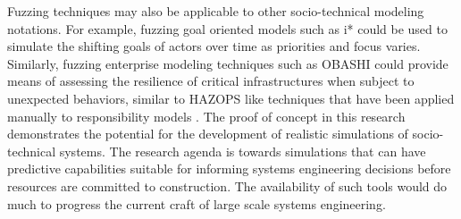 \documentclass{llncs}
\begin{document}
Fuzzing techniques may also be applicable to other socio-technical modeling notations.  For example, fuzzing goal
oriented models such as i* could be used to simulate the shifting goals of actors over time as priorities and focus
varies.  Similarly, fuzzing enterprise modeling techniques such as OBASHI could provide means of assessing the
resilience of critical infrastructures when subject to unexpected behaviors, similar to HAZOPS like techniques that have
been applied manually to responsibility models \citep{lock09modelling}. The proof of concept in this research demonstrates
the potential for the development of realistic simulations of socio-technical systems. The research agenda is towards
simulations that can have predictive capabilities suitable for informing systems engineering decisions before resources
are committed to construction.  The availability of such tools would do much to progress the current craft of large
scale systems engineering.






\end{document}
